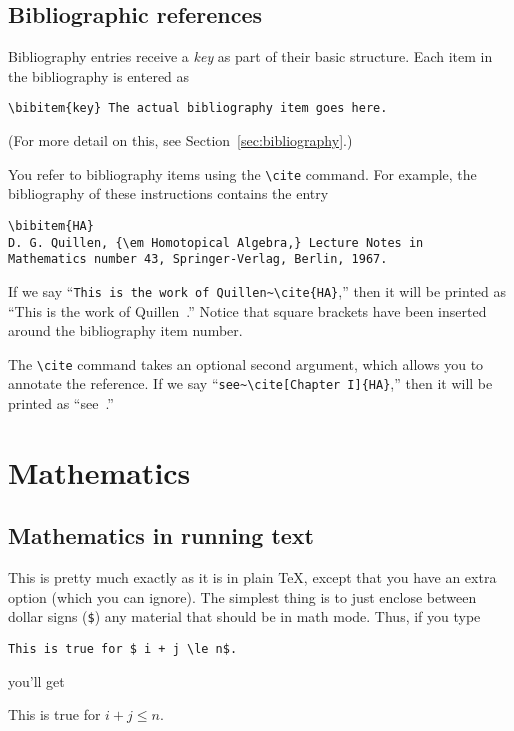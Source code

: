 \subsection{Bibliographic references}
\label{sec:bibreferences}


Bibliography entries receive a {\em key\/} as part of their basic
structure.  Each item in the bibliography is entered as
\begin{verbatim}
\bibitem{key} The actual bibliography item goes here.
\end{verbatim}
(For more detail on this, see Section~\ref{sec:bibliography}.)

You refer to bibliography items using the \verb"\cite" command.  For
example, the bibliography of these instructions contains the entry
%
\begin{verbatim}
\bibitem{HA}
D. G. Quillen, {\em Homotopical Algebra,} Lecture Notes in
Mathematics number 43, Springer-Verlag, Berlin, 1967.
\end{verbatim}
%
If we say ``\verb"This is the work of Quillen~\cite{HA}",'' then it
will be printed as ``This is the work of Quillen~\cite{HA}.''  Notice
that square brackets have been inserted around the bibliography item
number.

The \verb"\cite" command takes an optional second argument, which
allows you to annotate the reference.  If we say
``\verb"see~\cite[Chapter I]{HA}",'' then it will be printed as
``see~\cite[Chapter I]{HA}.''





\section{Mathematics}


\subsection{Mathematics in running text}

This is pretty much exactly as it is in plain \TeX, except that you
have an extra option (which you can ignore).  The simplest thing is
to just enclose between dollar signs (\verb"$") any material that should be
in math mode.  Thus, if you type
\begin{center}
\verb"This is true for $ i + j \le n$."
\end{center}
you'll get
\begin{center}
This is true for $ i + j \le n$.
\end{center}

